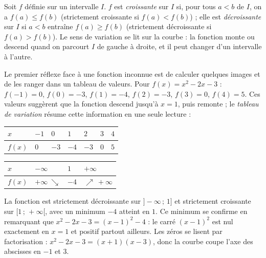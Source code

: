\begin{definition}
Soit $f$ définie sur un intervalle $I$. $f$ est \emph{croissante} sur $I$ si, pour tous $a < b$ de $I$, on a $f(a) \leq f(b)$ (strictement croissante si $f(a) < f(b)$) ; elle est \emph{décroissante} sur $I$ si $a < b$ entraîne $f(a) \geq f(b)$ (strictement décroissante si $f(a) > f(b)$). Le sens de variation se lit sur la courbe : la fonction monte ou descend quand on parcourt $I$ de gauche à droite, et il peut changer d'un intervalle à l'autre.
\end{definition}

Le premier réflexe face à une fonction inconnue est de calculer quelques images et de les ranger dans un tableau de valeurs. Pour $f(x) = x^{2} - 2x - 3$ : $f(-1) = 0$, $f(0) = -3$, $f(1) = -4$, $f(2) = -3$, $f(3) = 0$, $f(4) = 5$. Ces valeurs suggèrent que la fonction descend jusqu'à $x = 1$, puis remonte ; le \emph{tableau de variation} résume cette information en une seule lecture :

\begin{center}
\label{ch3:tab:valeurs}
\begin{tabular}{C{1.5cm}C{1.5cm}C{1.5cm}C{1.5cm}C{1.5cm}C{1.5cm}C{1.5cm}}
\toprule
$x$ & $-1$ & $0$ & $1$ & $2$ & $3$ & $4$ \\
\midrule
$f(x)$ & $0$ & $-3$ & $-4$ & $-3$ & $0$ & $5$ \\
\bottomrule
\end{tabular}
\end{center}

\begin{center}
\label{ch3:tab:variation}
\begin{tabular}{L{2.2cm}C{3.6cm}C{2.4cm}C{3.6cm}}
\toprule
$x$ & $-\infty$ & $1$ & $+\infty$ \\
\midrule
$f(x)$ & $+\infty \ \searrow$ & $-4$ & $\nearrow \ +\infty$ \\
\bottomrule
\end{tabular}
\end{center}

La fonction est strictement décroissante sur $]-\infty\,;\,1]$ et strictement croissante sur $[1\,;\,+\infty[$, avec un minimum $-4$ atteint en $1$. Ce minimum se confirme en remarquant que $x^{2} - 2x - 3 = (x-1)^{2} - 4$ : le carré $(x-1)^{2}$ est nul exactement en $x = 1$ et positif partout ailleurs. Les zéros se lisent par factorisation : $x^{2} - 2x - 3 = (x+1)(x-3)$, donc la courbe coupe l'axe des abscisses en $-1$ et $3$.

